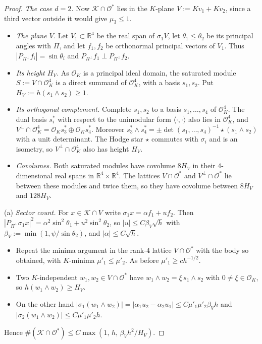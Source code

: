 \documentclass[aps,prx,twocolumn,superscriptaddress,nofootinbib,longbibliography]{revtex4-2}
\theoremstyle{plain}
\theoremstyle{definition}
\theoremstyle{remark}
\newcommand{\R}{\mathbb{R}}
\begin{document}
\begin{proof}
\emph{The case $d=2$.} Now $\mathcal K\cap\mathcal O^*$ lies in the $K$-plane $V:=Kv_1+Kv_2$, since a third vector outside it would give $\mu_3\le1$.
\begin{itemize}\setlength\itemsep{0pt}
\item \emph{The plane $V$.} Let $V_1\subset\R^4$ be the real span of $\sigma_1V$, let $\theta_1\le\theta_2$ be its principal angles with $\Pi$, and let $f_1,f_2$ be orthonormal principal vectors of $V_1$. Thus $|P_{\Pi^\perp}f_i|=\sin\theta_i$ and $P_{\Pi^\perp}f_1\perp P_{\Pi^\perp}f_2$.
\item \emph{Its height $H_V$.} As $\mathcal O_K$ is a principal ideal domain, the saturated module $S:=V\cap\mathcal O_K^4$ is a direct summand of $\mathcal O_K^4$, with a basis $s_1,s_2$. Put $H_V:=h(s_1\wedge s_2)\ge1$.
\item \emph{Its orthogonal complement.} Complete $s_1,s_2$ to a basis $s_1,\dots,s_4$ of $\mathcal O_K^4$. The dual basis $s_i^*$ with respect to the unimodular form $\langle\cdot,\cdot\rangle$ also lies in $\mathcal O_K^4$, and $V^\perp\cap\mathcal O_K^4=\mathcal O_Ks_3^*\oplus\mathcal O_Ks_4^*$. Moreover $s_3^*\wedge s_4^*=\pm\det(s_1,\dots,s_4)^{-1}\star(s_1\wedge s_2)$ with a unit determinant. The Hodge star $\star$ commutes with $\sigma_i$ and is an isometry, so $V^\perp\cap\mathcal O_K^4$ also has height $H_V$.
\item \emph{Covolumes.} Both saturated modules have covolume $8H_V$ in their $4$-dimensional real spans in $\R^4\times\R^4$. The lattices $V\cap\mathcal O^*$ and $V^\perp\cap\mathcal O^*$ lie between these modules and twice them, so they have covolume between $8H_V$ and $128H_V$.
\end{itemize}

(a) \emph{Sector count.} For $x\in\mathcal K\cap V$ write $\sigma_1x=\alpha f_1+uf_2$. Then $|P_{\Pi^\perp}\sigma_1x|^2=\alpha^2\sin^2\theta_1+u^2\sin^2\theta_2$, so $|u|\le C\beta_V\sqrt h$ with $\beta_V:=\min(1,\psi/\sin\theta_2)$, and $|\alpha|\le C\sqrt h$.
\begin{itemize}\setlength\itemsep{0pt}
\item Repeat the minima argument in the rank-$4$ lattice $V\cap\mathcal O^*$ with the body so obtained, with $K$-minima $\mu'_1\le\mu'_2$. As before $\mu'_1\ge ch^{-1/2}$.
\item Two $K$-independent $w_1,w_2\in V\cap\mathcal O^*$ have $w_1\wedge w_2=\xi\,s_1\wedge s_2$ with $0\ne\xi\in\mathcal O_K$, so $h(w_1\wedge w_2)\ge H_V$.
\item On the other hand $|\sigma_1(w_1\wedge w_2)|=|\alpha_1u_2-\alpha_2u_1|\le C\mu'_1\mu'_2\beta_V h$ and $|\sigma_2(w_1\wedge w_2)|\le C\mu'_1\mu'_2h$.
\end{itemize}
Hence $\#(\mathcal K\cap\mathcal O^*)\le C\max(1,\,h,\,\beta_V h^2/H_V)$.


\end{proof}
\end{document}

